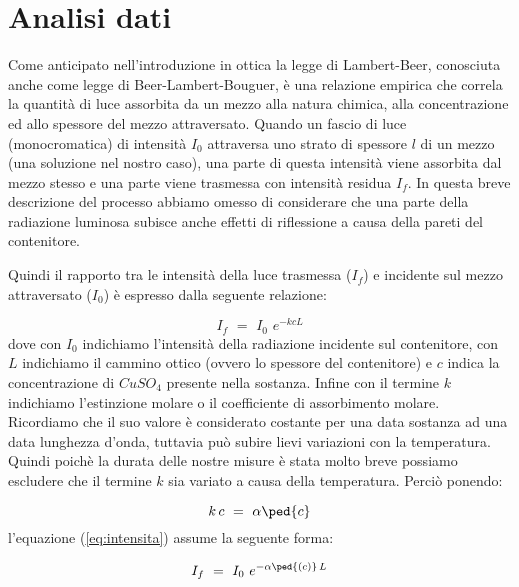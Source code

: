 \section{Analisi dati}

Come anticipato nell'introduzione in ottica la legge di Lambert-Beer, conosciuta anche come legge di Beer-Lambert-Bouguer, è una relazione empirica che correla la quantità di luce assorbita da un mezzo alla natura chimica, alla concentrazione ed allo spessore del mezzo attraversato.
Quando un fascio di luce (monocromatica) di intensità $I_0$ attraversa uno strato di spessore $l$ di un mezzo (una soluzione nel nostro caso), una parte di questa intensità viene assorbita dal mezzo stesso e una parte viene trasmessa con intensità residua $I_f$.
In questa breve descrizione del processo abbiamo omesso di considerare che una parte della radiazione luminosa subisce anche effetti di riflessione a causa della pareti del contenitore.

Quindi il rapporto tra le intensità della luce trasmessa ($I_f$) e incidente sul mezzo attraversato ($I_0$) è espresso dalla seguente relazione:

\begin{equation}
	I_f \,\,=\,\, I_0 \,\, e^{-kcL}
	\label{eq:intensita}
\end{equation}
%
dove con $I_0$ indichiamo l'intensità della radiazione incidente sul contenitore, con $L$ indichiamo il cammino ottico (ovvero lo spessore del contenitore) e $c$ indica la concentrazione di $CuSO_4$ presente nella sostanza. Infine con il termine $k$ indichiamo l'estinzione molare o il coefficiente di assorbimento molare. Ricordiamo che il suo valore è considerato costante per una data sostanza ad una data lunghezza d'onda, tuttavia può subire lievi variazioni con la temperatura.
Quindi poichè la durata delle nostre misure è stata molto breve possiamo escludere che il termine $k$ sia variato a causa della temperatura. Perciò ponendo:

\begin{equation}
	k\,c \,\,=\,\, \alpha\ped{c}
\end{equation}
%
l'equazione (\ref{eq:intensita}) assume la seguente forma:

\begin{equation}
	I_f \,\,=\,\, I_0 \,\, e^{-\alpha\ped{(c)}\,L}
\end{equation}
%

 
